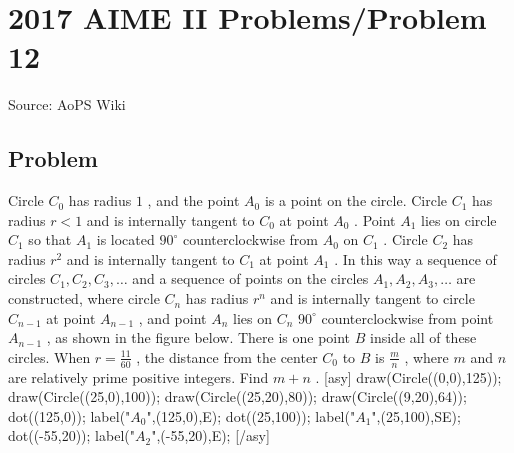 \documentclass[12pt]{article}
\begin{document}
\section*{{2017 AIME II Problems/Problem 12}}
Source: AoPS Wiki

\subsection*{Problem}
Circle $C_0$ has radius $1$ , and the point $A_0$ is a point on the circle. Circle $C_1$ has radius $r<1$ and is internally tangent to $C_0$ at point $A_0$ . Point $A_1$ lies on circle $C_1$ so that $A_1$ is located $90^{\circ}$ counterclockwise from $A_0$ on $C_1$ . Circle $C_2$ has radius $r^2$ and is internally tangent to $C_1$ at point $A_1$ . In this way a sequence of circles $C_1,C_2,C_3,\ldots$ and a sequence of points on the circles $A_1,A_2,A_3,\ldots$ are constructed, where circle $C_n$ has radius $r^n$ and is internally tangent to circle $C_{n-1}$ at point $A_{n-1}$ , and point $A_n$ lies on $C_n$ $90^{\circ}$ counterclockwise from point $A_{n-1}$ , as shown in the figure below. There is one point $B$ inside all of these circles. When $r = \frac{11}{60}$ , the distance from the center $C_0$ to $B$ is $\frac{m}{n}$ , where $m$ and $n$ are relatively prime positive integers. Find $m+n$ . [asy] draw(Circle((0,0),125)); draw(Circle((25,0),100)); draw(Circle((25,20),80)); draw(Circle((9,20),64)); dot((125,0)); label("$A_0$",(125,0),E); dot((25,100)); label("$A_1$",(25,100),SE); dot((-55,20)); label("$A_2$",(-55,20),E); [/asy]
\end{document}
